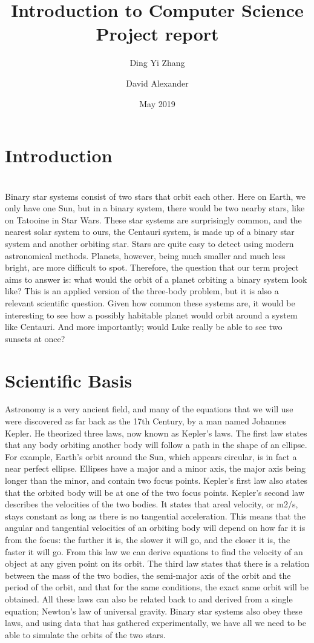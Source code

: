 \documentclass{article}
\title{Introduction to Computer Science\\ Project report}
\author{Ding Yi Zhang
\and David Alexander}
\date{May 2019}
\begin{document}
\begin{titlepage}
\maketitle
\end{titlepage}

\section{Introduction}
\\Binary star systems consist of two stars that orbit each other. Here on Earth, we only have one Sun, but in a binary system, there would be two nearby stars, like on Tatooine in Star Wars. These star systems are surprisingly common, and the nearest solar system to ours, the Centauri system, is made up of a binary star system and another orbiting star. Stars are quite easy to detect using modern astronomical methods. Planets, however, being much smaller and much less bright, are more difficult to spot. Therefore, the question that our term project aims to answer is: what would the orbit of a planet orbiting a binary system look like? This is an applied version of the three-body problem, but it is also a relevant scientific question. Given how common these systems are, it would be interesting to see how a possibly habitable planet would orbit around a system like Centauri. And more importantly; would Luke really be able to see two sunsets at once?

\section{Scientific Basis}
Astronomy is a very ancient field, and many of the equations that we will use were discovered as far back as the 17th Century, by a man named Johannes Kepler. He theorized three laws, now known as Kepler’s laws. The first law states that any body orbiting another body will follow a path in the shape of an ellipse. For example, Earth’s orbit around the Sun, which appears circular, is in fact a near perfect ellipse. Ellipses have a major and a minor axis, the major axis being longer than the minor, and contain two focus points. Kepler’s first law also states that the orbited body will be at one of the two focus points. Kepler’s second law describes the velocities of the two bodies. It states that areal velocity, or m2/s, stays constant as long as there is no tangential acceleration. This means that the angular and tangential velocities of an orbiting body will depend on how far it is from the focus: the further it is, the slower it will go, and the closer it is, the faster it will go. From this law we can derive equations to find the velocity of an object at any given point on its orbit. The third law states that there is a relation between the mass of the two bodies, the semi-major axis of the orbit and the period of the orbit, and that for the same conditions, the exact same orbit will be obtained. All these laws can also be related back to and derived from a single equation; Newton’s law of universal gravity.  Binary star systems also obey these laws, and using data that has gathered experimentally, we have all we need to be able to simulate the orbits of the two stars.
\end{document}
